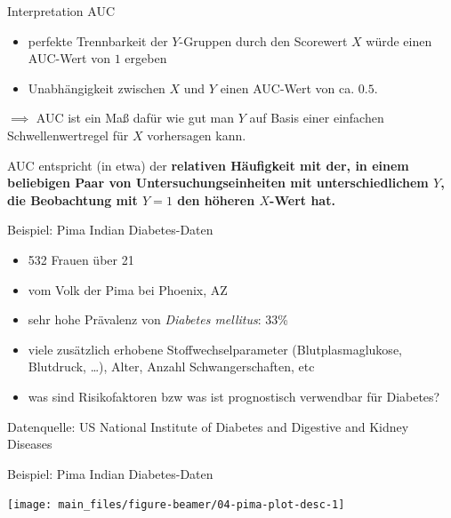 \documentclass[
  10pt,
  ignorenonframetext,
]{beamer}
\providecommand{\tightlist}{%
  \setlength{\itemsep}{0pt}\setlength{\parskip}{0pt}}
\begin{document}
\begin{frame}{Interpretation AUC}
\label{interpretation-auc}
\begin{itemize}
\tightlist
\item
  perfekte Trennbarkeit der \(Y\)-Gruppen durch den Scorewert \(X\)
  würde einen AUC-Wert von \(1\) ergeben
\item
  Unabhängigkeit zwischen \(X\) und \(Y\) einen AUC-Wert von ca.
  \(0.5\).
\end{itemize}

\(\implies\) AUC ist ein Maß dafür wie gut man \(Y\) auf Basis einer
einfachen Schwellenwertregel für \(X\) vorhersagen kann.

AUC entspricht (in etwa) der \textbf{relativen Häufigkeit mit der, in
einem beliebigen Paar von Untersuchungseinheiten mit unterschiedlichem
\(Y\), die Beobachtung mit \(Y = 1\) den höheren \(X\)-Wert hat.}
\end{frame}

\begin{frame}{Beispiel: Pima Indian Diabetes-Daten}
\label{beispiel-pima-indian-diabetes-daten}
\scriptsize\normalsize

\begin{itemize}
\tightlist
\item
  532 Frauen über 21
\item
  vom Volk der Pima bei Phoenix, AZ
\item
  sehr hohe Prävalenz von \emph{Diabetes mellitus}: 33\%
\item
  viele zusätzlich erhobene Stoffwechselparameter (Blutplasmaglukose,
  Blutdruck, \ldots), Alter, Anzahl Schwangerschaften, etc
\item
  was sind Risikofaktoren bzw was ist prognostisch verwendbar für
  Diabetes?
\end{itemize}

Datenquelle: US National Institute of Diabetes and Digestive and Kidney
Diseases
\end{frame}

\begin{frame}{Beispiel: Pima Indian Diabetes-Daten}
\label{beispiel-pima-indian-diabetes-daten-1}
\scriptsize

\begin{center}\texttt{[image: main\_files/figure-beamer/04-pima-plot-desc-1]} \end{center}

\normalsize
\end{frame}
\end{document}
